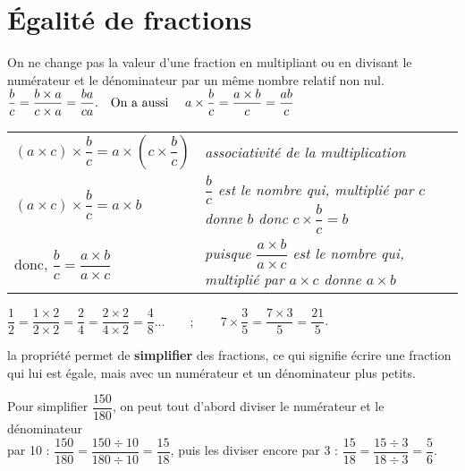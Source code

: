 \cours 

\section{Égalité de fractions}

\begin{propriete}
   On ne change pas la valeur d'une fraction en multipliant ou en divisant le numérateur et le dénominateur par un même nombre relatif non nul. \\ [1mm]
   \hspace*{3cm} $\dfrac{b}{c} =\dfrac{b\times a}{c\times a}= \dfrac{ba}{ca}. \text{\quad On a aussi \quad }a\times\dfrac{b}{c}= \dfrac{a\times b}{c} =\dfrac{ab}{c}$
\end{propriete}

\begin{preuve}
{
   \begin{tabular}{p{3.7cm}p{10cm}}
      $(a\times c)\times\dfrac{b}{c} =a\times \left(c\times\dfrac{b}{c}\right)$
      &
      {\it associativité de la multiplication}
      \\
      $(a\times c)\times\dfrac{b}{c} =a\times b$
      &
      {\it $\dfrac{b}{c}$ est le nombre qui, multiplié par $c$ donne $b$ donc $c\times\dfrac{b}{c} =b$}
      \\
      donc, $\dfrac{b}{c} =\dfrac{a\times b}{a\times c}$
      &
      {\it puisque $\dfrac{a\times b}{a\times c}$ est le nombre qui, multiplié par $a\times c$ donne $a\times b$}
      \\
   \end{tabular}}
\end{preuve}

\begin{exemple*1}   
   $\dfrac12 =\dfrac{1\times2}{2\times2} =\dfrac24 =\dfrac{2\times2}{4\times2} = \dfrac48\dots \qquad ; \qquad 7\times\dfrac{3}{5} =\dfrac{7\times3}{5} =\dfrac{21}{5}$.
\end{exemple*1}

\begin{remarque}
   la propriété permet de {\bf simplifier} des fractions, ce qui  signifie écrire une fraction qui lui est égale, mais avec un numérateur et un dénominateur plus petits.
\end{remarque}

\begin{exemple*1}
   Pour simplifier $\dfrac{150}{180}$, on peut tout d'abord diviser le numérateur et le dénominateur \\ [1mm]
      par 10 : $\dfrac{150}{180} =\dfrac{150\div10}{180\div10} =\dfrac{15}{18}$, puis les diviser encore par 3 : $\dfrac{15}{18} =\dfrac{15\div3}{18\div3} =\dfrac56$.
\end{exemple*1}


